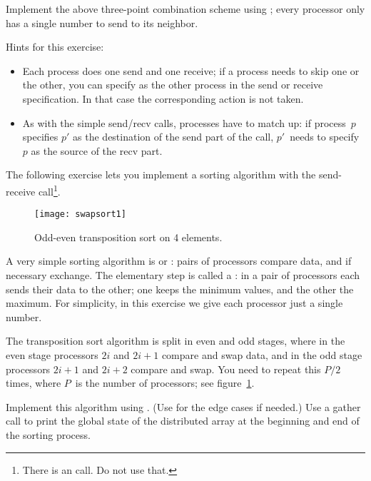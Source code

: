\begin{exercise}
  \label{ex:3ptsendrecv}
  Implement the above three-point combination scheme using ;
  every processor only has a single number to send to its neighbor.
\end{exercise}

Hints for this exercise:
\begin{itemize}
\item Each process does one send and one receive; if a process needs
  to skip one or the other, you can specify
   as the other process in the send or
  receive specification. In that case the corresponding action
  is not taken.
\item As with the simple send/recv calls, processes have to match up:
  if process~$p$ specifies $p'$ as the destination of the send part of
  the call, $p'$~needs to specify $p$ as the source of the recv part.
\end{itemize}

The following exercise lets you implement a sorting algorithm with the
send-receive call\footnote {There is an 
  call. Do not use that.}.

\begin{figure}[ht]
  \texttt{[image: swapsort1]}
  \caption{Odd-even transposition sort on 4 elements.}
  \label{fig:swapsort1}
\end{figure}

\begin{exercise}
  \label{ex:exchangesort}
  A very simple sorting algorithm is  or
  :
  pairs of processors compare data, and if necessary exchange. The
  elementary step is called a : in a pair
  of processors each sends their data to the other; one keeps the
  minimum values, and the other the maximum.
  For simplicity, in this exercise we give each processor just a single number.

  The transposition sort algorithm is split in even and odd stages, where
  in the even stage processors $2i$ and $2i+1$ compare and swap data,
  and in the odd stage processors $2i+1$ and $2i+2$ compare and swap.
  You need to repeat this $P/2$ times, where $P$~is the number of
  processors; see figure~\ref{fig:swapsort1}.

  Implement this algorithm using . (Use
   for the edge cases if needed.)
  Use a gather call to print the global state of the distributed array
  at the beginning and end of the sorting process.
\end{exercise}

